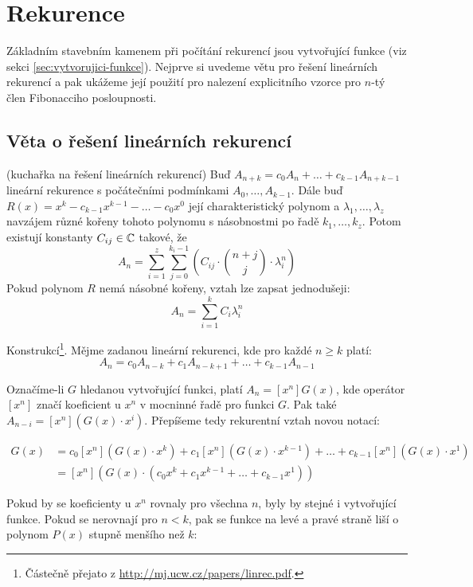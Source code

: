 \section{Rekurence}
\label{sec:rekurence}

Základním stavebním kamenem při počítání rekurencí jsou vytvořující funkce (viz
sekci \ref{sec:vytvorujici-funkce}). Nejprve si uvedeme větu pro řešení
lineárních rekurencí a pak ukážeme její použití pro nalezení explicitního
vzorce pro $n$-tý člen Fibonacciho posloupnosti.

\subsection{Věta o řešení lineárních rekurencí}

\vt (kuchařka na řešení lineárních rekurencí) Buď $A_{n+k} = c_0A_n + \dots +
c_{k-1}A_{n+k-1}$ lineární rekurence s počátečními podmínkami
$A_0,\dots,A_{k-1}$. Dále buď $R(x) = x^k - c_{k-1}x^{k-1} - \dots - c_0x^0$
její charakteristický polynom a $\lambda_1,\dots,\lambda_z$ navzájem různé
kořeny tohoto polynomu s násobnostmi po řadě $k_1,\dots,k_z$. Potom existují
konstanty $C_{ij} \in \mathbb{C}$ takové, že
$$A_n = \sum_{i=1}^z\sum_{j=0}^{k_i-1}\left(C_{ij}\cdot{n+j\choose j}\cdot\lambda_i^n\right)$$
Pokud polynom $R$ nemá násobné kořeny, vztah lze zapsat jednodušeji:
$$A_n = \sum_{i=1}^kC_i\lambda_i^n$$

\dk Konstrukcí\footnote{Částečně přejato z \url{http://mj.ucw.cz/papers/linrec.pdf}.}. Mějme zadanou lineární rekurenci, kde pro každé $n\ge k$ platí:
$$A_n = c_0A_{n-k} + c_1A_{n-k+1} + \dots + c_{k-1}A_{n-1}$$

Označíme-li $G$ hledanou vytvořující funkci, platí $A_n = [x^n]G(x)$, kde
operátor $[x^n]$ značí koeficient u $x^n$ v mocninné řadě pro funkci $G$. Pak
také $A_{n-i} = [x^n](G(x)\cdot x^i)$. Přepíšeme tedy rekurentní vztah novou
notací:

\begin{align}
[x^n]G(x) &= c_0[x^n](G(x)\cdot x^k) + c_1[x^n](G(x)\cdot x^{k-1}) + \dots + c_{k-1}[x^n](G(x)\cdot x^1) \\
&= [x^n]\left(G(x)\cdot (c_0x^k + c_1x^{k-1} + \dots + c_{k-1}x^1)\right)\end{align}

Pokud by se koeficienty u $x^n$ rovnaly pro všechna $n$, byly by stejné i
vytvořující funkce. Pokud se nerovnají pro $n<k$, pak se funkce na levé a pravé
straně liší o polynom $P(x)$ stupně menšího než $k$:

